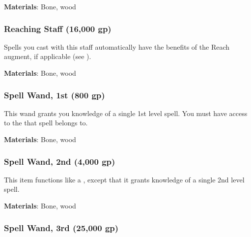 \vspace{0.25em}
\textbf{Materials}: Bone, wood


\lowercase{\hypertarget{item:Reaching Staff}{}}\label{item:Reaching Staff}
\hypertarget{item:Reaching Staff}{\subsubsection{Reaching Staff\hfill{} (16,000 gp)}}

Spells you cast with this staff automatically have the benefits of the Reach augment, if applicable (see ).



\vspace{0.25em}
\textbf{Materials}: Bone, wood


\lowercase{\hypertarget{item:Spell Wand, 1st}{}}\label{item:Spell Wand, 1st}
\hypertarget{item:Spell Wand, 1st}{\subsubsection{Spell Wand, 1st\hfill{} (800 gp)}}

This wand grants you knowledge of a single 1st level spell.
You must have access to the  that spell belongs to.



\vspace{0.25em}
\textbf{Materials}: Bone, wood


\lowercase{\hypertarget{item:Spell Wand, 2nd}{}}\label{item:Spell Wand, 2nd}
\hypertarget{item:Spell Wand, 2nd}{\subsubsection{Spell Wand, 2nd\hfill{} (4,000 gp)}}

This item functions like a , except that it grants knowledge of a single 2nd level spell.



\vspace{0.25em}
\textbf{Materials}: Bone, wood


\lowercase{\hypertarget{item:Spell Wand, 3rd}{}}\label{item:Spell Wand, 3rd}
\hypertarget{item:Spell Wand, 3rd}{\subsubsection{Spell Wand, 3rd\hfill{} (25,000 gp)}}

